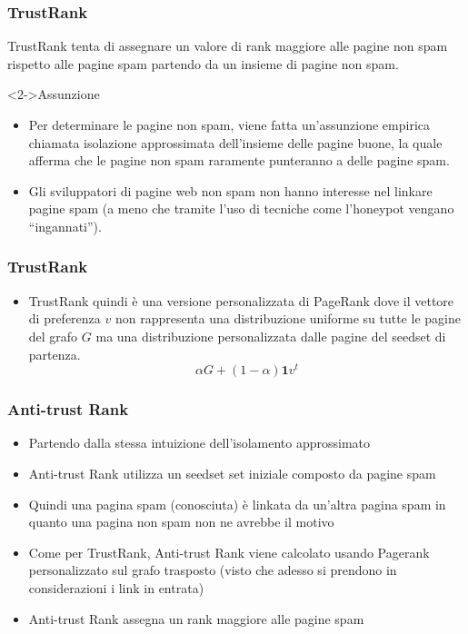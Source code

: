 \documentclass{beamer}
\begin{document}
\begin{frame}
  \frametitle{TrustRank}
  TrustRank tenta di assegnare un valore di rank maggiore alle pagine non spam rispetto alle pagine spam partendo da un insieme di pagine non spam.
  \begin{block}<2->{Assunzione}
  \begin{itemize}
   \item Per determinare le pagine non spam, viene fatta un’assunzione empirica chiamata isolazione approssimata dell’insieme delle pagine buone, la quale afferma che le pagine non spam raramente punteranno a delle pagine spam.
   \item Gli sviluppatori di pagine web non spam non hanno interesse nel linkare pagine spam (a meno che tramite l’uso di tecniche come l’honeypot vengano “ingannati”).
  \end{itemize}
  \end{block}
\end{frame}
\begin{frame}
  \frametitle{TrustRank}
  \begin{itemize}
   \item   TrustRank quindi è una versione personalizzata di PageRank dove il vettore di preferenza \(v\) non rappresenta una distribuzione uniforme su tutte le pagine del grafo \(G\) ma una distribuzione personalizzata dalle pagine del seedset di partenza.
$$
   \alpha G + (1-\alpha)\textbf{1}v^t
$$
  \end{itemize}
\end{frame}
\begin{frame}
  \frametitle{Anti-trust Rank}
  \begin{itemize}
   \item Partendo dalla stessa intuizione dell'isolamento approssimato 
   \item Anti-trust Rank utilizza un seedset set iniziale composto da pagine spam
   \item Quindi una pagina spam (conosciuta) è linkata da un'altra pagina spam in quanto una pagina non spam non ne avrebbe il motivo 
   \item Come per TrustRank, Anti-trust Rank viene calcolato usando Pagerank personalizzato sul grafo trasposto (visto che adesso si prendono in considerazioni i link in entrata)
   \item Anti-trust Rank assegna un rank maggiore alle pagine spam
  \end{itemize}
\end{frame}
\end{document}
